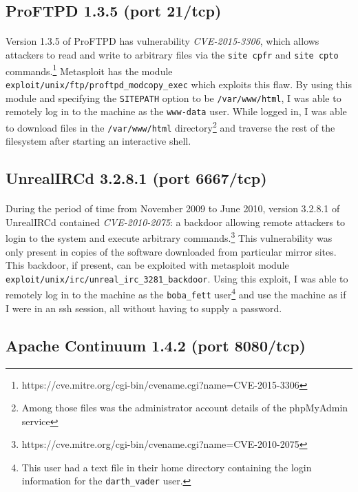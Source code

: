 \documentclass{article}
\begin{document}
\subsection{ProFTPD 1.3.5 (port 21/tcp)}
\label{subsec:pro_ftpd}
\paragraph{}
Version 1.3.5 of ProFTPD has vulnerability \emph{CVE-2015-3306}, which allows attackers to read and write to arbitrary files via the \texttt{site cpfr} and \texttt{site cpto} commands.\footnote{https://cve.mitre.org/cgi-bin/cvename.cgi?name=CVE-2015-3306}
Metasploit has the module \texttt{exploit/unix/ftp/proftpd\_modcopy\_exec} which exploits this flaw.
By using this module and specifying the \texttt{SITEPATH} option to be \texttt{/var/www/html}, I was able to remotely log in to the machine as the \texttt{www-data} user.
While logged in, I was able to download files in the \texttt{/var/www/html} directory\footnote{Among those files was the administrator account details of the phpMyAdmin service} and traverse the rest of the filesystem after starting an interactive shell.

\subsection{UnrealIRCd 3.2.8.1 (port 6667/tcp)}
\label{subsec:unreal_ircd}
\paragraph{}
During the period of time from November 2009 to June 2010, version 3.2.8.1 of UnrealIRCd contained \emph{CVE-2010-2075}: a backdoor allowing remote attackers to login to the system and execute arbitrary commands.\footnote{https://cve.mitre.org/cgi-bin/cvename.cgi?name=CVE-2010-2075}
This vulnerability was only present in copies of the software downloaded from particular mirror sites.
This backdoor, if present, can be exploited with metasploit module \texttt{exploit/unix/irc/unreal\_irc\_3281\_backdoor}.
Using this exploit, I was able to remotely log in to the machine as the \texttt{boba\_fett} user\footnote{This user had a text file in their home directory containing the login information for the \texttt{darth\_vader} user.} and use the machine as if I were in an ssh session, all without having to supply a password.

\subsection{Apache Continuum 1.4.2 (port 8080/tcp)}
\label{subsec:apache_continuum}
\end{document}
